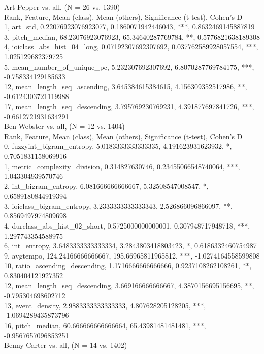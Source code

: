 Art Pepper vs. all, (N = 26 vs. 1390)\\
Rank, Feature, Mean (class), Mean (others), Significance (t-test), Cohen's D\\
1, art_std, 0.22076923076923077, 0.1860071942446043, ***, 0.8632469145887819\\
3, pitch_median, 68.23076923076923, 65.34640287769784, **, 0.5776821638189308\\
4, ioiclass_abs_hist_04_long, 0.07192307692307692, 0.037762589928057554, ***, 1.025129682379725\\
5, mean_number_of_unique_pc, 5.232307692307692, 6.8070287769784175, ***, -0.758334129185633\\
12, mean_length_seq_ascending, 3.645384615384615, 4.156309352517986, **, -0.6124303721119988\\
17, mean_length_seq_descending, 3.795769230769231, 4.391877697841726, ***, -0.6612721931634291\\
Ben Webster vs. all, (N = 12 vs. 1404)\\
Rank, Feature, Mean (class), Mean (others), Significance (t-test), Cohen's D\\
0, fuzzyint_bigram_entropy, 5.0183333333333335, 4.191623931623932, *, 0.7051831158069916\\
1, metric_complexity_division, 0.314827630746, 0.23455066548740064, ***, 1.043304939570746\\
2, int_bigram_entropy, 6.081666666666667, 5.32508547008547, *, 0.6589180844919394\\
3, ioiclass_bigram_entropy, 3.2333333333333343, 2.526866096866097, **, 0.8569497974809698\\
4, durclass_abs_hist_02_short, 0.5725000000000001, 0.307948717948718, ***, 1.297743354588975\\
6, int_entropy, 3.6483333333333334, 3.2843803418803423, *, 0.6186332460754987\\
9, avgtempo, 124.24166666666667, 195.66965811965812, ***, -1.0274164558599808\\
10, ratio_ascending_descending, 1.1716666666666666, 0.9237108262108261, **, 0.830404121927352\\
12, mean_length_seq_descending, 3.669166666666667, 4.3870156695156695, **, -0.795304698602712\\
13, event_density, 2.9883333333333333, 4.807628205128205, ***, -1.0694289435873796\\
16, pitch_median, 60.666666666666664, 65.43981481481481, ***, -0.9567657096853251\\
Benny Carter vs. all, (N = 14 vs. 1402)\\

